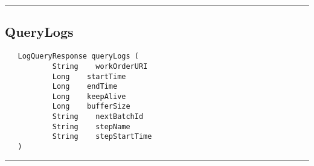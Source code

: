 \rule{15cm}{2pt}
\subsection{QueryLogs}
\label{Api:QueryLogs}
\begin{verbatim}
   LogQueryResponse queryLogs (
           String    workOrderURI
           Long    startTime
           Long    endTime
           Long    keepAlive
           Long    bufferSize
           String    nextBatchId
           String    stepName
           String    stepStartTime
   )
\end{verbatim}



\rule{15cm}{2pt}
